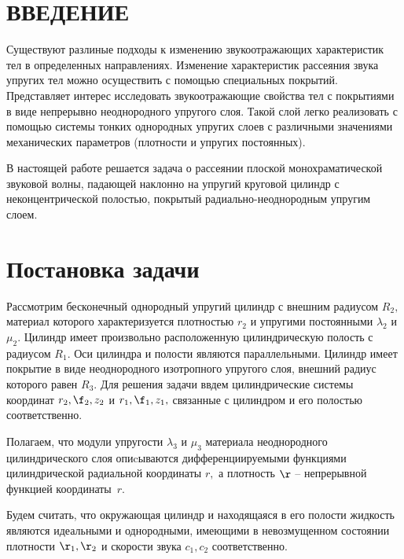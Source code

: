 

\renewcommand{\bibname}{СПИСОК ИСПОЛЬЗОВАННЫХ ИСТОЧНИКОВ}
\renewcommand\refname{СПИСОК ИСПОЛЬЗОВАННЫХ ИСТОЧНИКОВ}

%

\setcounter{page}{2}
\thispagestyle {empty}
\renewcommand{\contentsname}{\centering СОДЕРЖАНИЕ}
\tableofcontents

\newpage
\section*{ВВЕДЕНИЕ}
Существуют разлиные подходы к изменению звукоотражающих характеристик тел в определенных направлениях. Изменение характеристик рассеяния звука упругих тел можно осуществить с помощью специальных покрытий. Представляет интерес исследовать звукоотражающие свойства тел с покрытиями в виде непрерывно неоднородного упругого слоя. Такой слой легко реализовать с помощью системы тонких однородных упругих слоев с различными значениями механических параметров (плотности и упругих постоянных).

В настоящей работе решается задача о рассеянии плоской монохраматической звуковой волны, падающей наклонно на упругий круговой цилиндр с неконцентрической полостью, покрытый радиально-неоднородным упругим слоем.

\newpage
\section{Постановка задачи} Рассмотрим бесконечный однородный упругий цилиндр с внешним радиусом $R_2,$ материал которого характеризуется плотностью $r_2$ и упругими постоянными $\lambda_2$ и $\mu_2.$ Цилиндр имеет произвольно расположенную цилиндрическую полость с радиусом $R_1.$ Оси цилиндра и полости являются параллельными. Цилиндр имеет покрытие в виде неоднородного изотропного упругого слоя, внешний радиус которого равен $R_3.$ Для решения задачи ввдем цилиндрические системы координат $r_2, \f_2, z_2$ и $r_1, \f_1, z_1,$ связанные с цилиндром и его полостью соответственно.

Полагаем, что модули упругости $\lambda_3$ и $\mu_3$ материала неоднородного цилиндрического слоя опиcываются дифференциируемыми функциями цилиндрической радиальной координаты $r,$ а плотность $\r$ -- непрерывной функцией координаты~$r.$ 

Будем считать, что окружающая цилиндр и находящаяся в его полости жидкость являются идеальными и однородными, имеющими в невозмущенном состоянии плотности $\r_1, \r_2$ и скорости звука $c_1, c_2$ соответственно.

